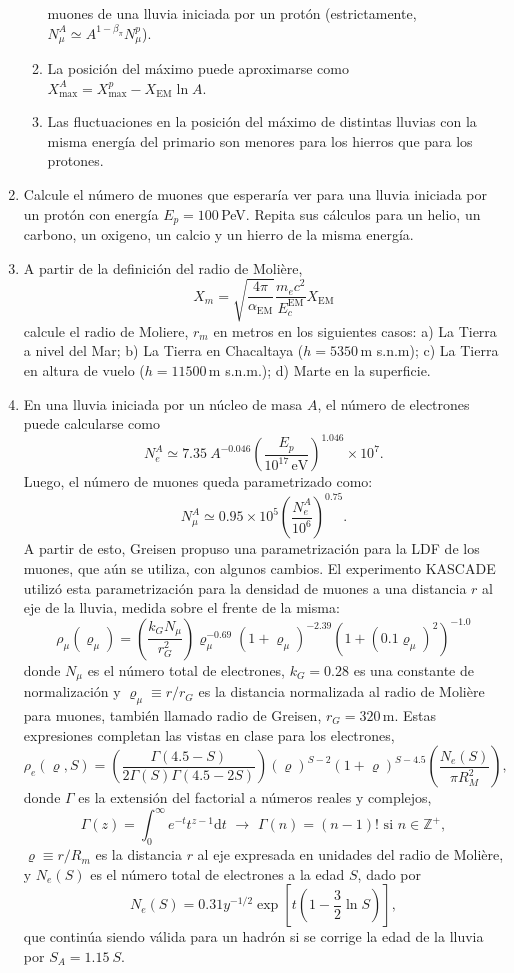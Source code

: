 \documentclass[11pt]{article}
\begin{document}
\begin{enumerate}
\begin{enumerate}
				muones de una lluvia iniciada por un protón (estrictamente,
				$N_\mu^A \simeq A^{1-\beta_\pi} N_\mu^p$).
			\item La posición del máximo puede aproximarse como $X_{\max}^A =
				X_{\max}^{p} - X_{\mathrm{EM}} \ln A$.
			\item Las fluctuaciones en la posición del máximo de distintas
				lluvias con la misma energía del primario son menores para los
				hierros que para los protones. 
		\end{enumerate}
	\item Calcule el número de muones que esperaría ver para una lluvia
		iniciada por un protón con energía $E_p = 100$\,PeV. Repita sus
		cálculos para un helio, un carbono, un oxigeno, un calcio y un hierro
		de la misma energía.
	\item A partir de la definición del radio de Molière, 
		\[ X_m = \sqrt{\frac{4\pi}{\alpha_{\mathrm{EM}}}} \frac{m_e
		c^2}{E_{c}^{\mathrm{EM}}} X_{\mathrm{EM}}\]
		calcule el radio de Moliere, $r_m$ en metros en los siguientes casos:
		a) La Tierra a nivel del Mar; b) La Tierra en Chacaltaya ($h=5350$\,m
		s.n.m); c) La Tierra en altura de vuelo ($h=11500$\,m s.n.m.); d) Marte
		en la superficie.
	\item En una lluvia iniciada por un núcleo de masa $A$, el número de
		electrones puede calcularse como 
		\[N_e^A \simeq 7.35\ A^{-0.046} \left (
		\frac{E_p}{10^{17}\mathrm{\,eV}} \right )^{1.046} \times 10^7.\]
		Luego, el número de muones queda parametrizado como:
		\[N_\mu^A \simeq 0.95 \times 10^5  \left ( \frac{N_e^A}{10^6} \right
		)^{0.75}.\]
		A partir de esto, Greisen propuso una parametrización para la LDF de
		los muones, que aún se utiliza, con algunos cambios. El experimento
		KASCADE utilizó esta parametrización para la densidad de muones a una
		distancia $r$ al eje de la lluvia, medida sobre el frente de la misma:
		\[
			\rho_\mu(\varrho_\mu) = \left (\frac{k_G N_\mu}{r_G^2} \right )
			\varrho_\mu^{-0.69} \left ( 1 + \varrho_\mu \right
			)^{-2.39} \left ( 1 + \left (0.1 \varrho_\mu \right )^2 \right
			)^{-1.0}
		\]
		donde $N_\mu$ es el número total de electrones, $k_G=0.28$ es una
		constante de normalización y $\varrho_\mu\equiv r/r_G$ es la distancia
		normalizada al radio de Molière para muones, también llamado radio de
		Greisen, $r_G=320$\,m. Estas expresiones completan las vistas en
		clase para los electrones, 
		\[
			\rho_e(\varrho, S) = \left ( \frac{\Gamma(4.5 - S)}{2 \Gamma(S)
			\Gamma(4.5 - 2S)} \right ) \left( \varrho \right)^{S-2} \left(1 +
			\varrho \right)^{S-4.5} \left ( \frac{N_e(S)}{\pi R_M^2} \right),
		\]
		donde $\Gamma$ es la extensión del factorial a números reales y
		complejos,
		\[
			\Gamma(z) = \int_0^\infty e^{-t} t^{z-1} \mathrm{d} t \,\, \to \,\,
			\Gamma(n) = (n-1)! \,\,\mathrm{si}\,\, n \in \mathbb{Z}^+,
		\]
		$\varrho \equiv r/R_m$ es la distancia $r$ al eje expresada en unidades
		del radio de Molière, y $N_e(S)$ es el número total de electrones a la
		edad $S$, dado por
		\[
			N_e (S) = 0.31 y^{-1/2}  \exp \left [t \left ( 1 - \frac32 \ln S
			\right ) \right ],
		\]
		que continúa siendo válida para un hadrón si se corrige la edad de la
		lluvia por $S_A=1.15\ S$.
		

\end{enumerate}
\end{document}
